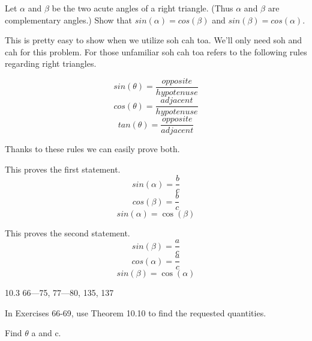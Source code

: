 \documentclass[10pt,letterpaper]{amspset}
\begin{document}
\pagebreak


\begin{problem}[74]
Let $\alpha$ and $\beta$ be the two acute angles of a right triangle. (Thus $\alpha$ and $\beta$ are complementary angles.) Show that $sin(\alpha) = cos(\beta)$ and $sin(\beta) = cos(\alpha)$.
\end{problem}

\begin{solution}[Solution]


\bigskip

This is pretty easy to show when we utilize soh cah toa. We'll only need soh and cah for this problem. For those unfamiliar soh cah toa refers to the following rules regarding right triangles.

\[sin(\theta) = \frac{opposite}{hypotenuse}\]
\[cos(\theta) = \frac{adjacent}{hypotenuse}\]
\[tan(\theta) = \frac{opposite}{adjacent}\]

Thanks to these rules we can easily prove both.  
\bigskip

This proves the first statement.
\[sin(\alpha) = \frac{b}{c}\]
\[cos(\beta) = \frac{b}{c}\]
\[\boxed{sin(\alpha) = \cos(\beta)}\]

This proves the second statement.
\[sin(\beta) = \frac{a}{c}\]
\[cos(\alpha) = \frac{a}{c}\]
\[\boxed{sin(\beta) = \cos(\alpha)}\]
\end{solution}


\pagebreak

10.3 66—75, 77—80, 135, 137  

In Exercises 66-69, use Theorem 10.10 to find the requested quantities.

\begin{problem}[66]
Find $\theta$ a and c.
\end{problem}
\end{document}
